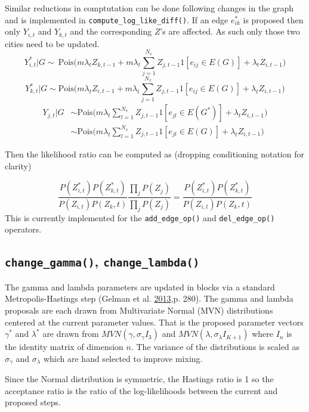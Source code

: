 \documentclass[11pt,a4paper]{article}
\numberwithin{equation}{section}
\begin{document}
Similar reductions in comptutation can be done following changes in the
graph and is implemented in \texttt{compute\_log\_like\_diff()}. If an
edge \(e^*_{ik}\) is proposed then only \(Y_{i,t}\) and \(Y_{k,t}\) and
the corresponding \(Z\)'s are affected. As such only those two cities
need to be updated.
\[Y^*_{i,t}|G \sim ~ \text{Pois}\big(m\lambda_tZ_{k,t-1} +m\lambda_t\sum_{j=1}^{N_v}Z_{j,t-1}1[e_{ij}\in E(G)]+ \lambda_tZ_{i,t-1}\big) \]
\[Y^*_{k,t}|G \sim  \text{Pois}\big(m\lambda_tZ_{i,t-1} +m\lambda_t\sum_{j=1}^{N_v}Z_{j,t-1}1[e_{ij}\in E(G)]+ \lambda_tZ_{i,t-1}\big) \]
\[\begin{aligned} Y_{j,t}|G &\sim \text{Pois}\big(m\lambda_t\sum_{l=1}^{N_v}Z_{j,t-1}1[e_{jl}\in E(G^*)]+ \lambda_tZ_{i,t-1}\big)\\ & \sim  \text{Pois}\big(m\lambda_t\sum_{l=1}^{N_v}Z_{j,t-1}1[e_{jl}\in E(G)]+ \lambda_tZ_{i,t-1}\big) \end{aligned}\]

Then the likelihood ratio can be computed as (dropping conditioning
notation for clarity)

\[ \frac{P(Z^*_{i,t})P(Z^*_{k,t})}{P(Z_{i,t})P(Z_k,t)}\frac{\prod_j P(Z_{j})}{\prod_{j}P( Z_{j})} = \frac{P(Z^*_{i,t})P(Z^*_{k,t})}{P(Z_{i,t})P(Z_k,t)} \]
This is currently implemented for the \texttt{add\_edge\_op()} and
\texttt{del\_edge\_op()} operators.

\hypertarget{change_gamma-change_lambda}{%
\subsection{\texorpdfstring{\texttt{change\_gamma()},
\texttt{change\_lambda()}}{change\_gamma(), change\_lambda()}}\label{change_gamma-change_lambda}}

The gamma and lambda parameters are updated in blocks via a standard
Metropolis-Hastings step (Gelman et al.
\protect\hyperlink{ref-gelman_bayesian_2013}{2013},p. 280). The gamma
and lambda proposals are each drawn from Multivariate Normal (MVN)
distributions centered at the current parameter values. That is the
proposed parameter vectors \(\gamma^*\) and \(\lambda^*\) are drawn from
\(MVN(\gamma, \sigma_\gamma I_3)\) and
\(MVN(\lambda, \sigma_\lambda I_{K+1})\) where \(I_n\) is the identity
matrix of dimension \(n\). The variance of the distributions is scaled
as \(\sigma_\gamma\) and \(\sigma_\lambda\) which are hand selected to
improve mixing.

Since the Normal distribution is symmetric, the Hastings ratio is 1 so
the acceptance ratio is the ratio of the log-likelihoods between the
current and proposed steps.
\end{document}
